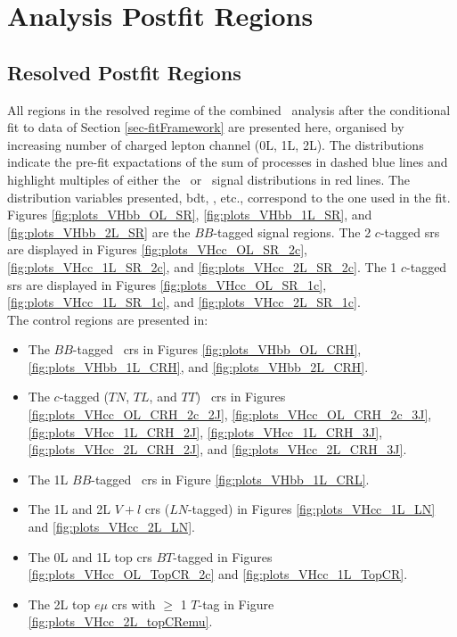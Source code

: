 \section{Analysis Postfit Regions}\label{appsec-vh-analRegPosfit}
\subsection{Resolved Postfit Regions}\label{appsec-vh-analRegResPosfit}
All regions in the resolved regime of the combined \vhbc\ analysis after the conditional fit to data of Section \ref{sec-fitFramework} are presented here, organised by increasing number of charged lepton channel (0L, 1L, 2L). The distributions indicate the pre-fit expactations of the sum of processes in dashed blue lines and highlight multiples of either the \vhb\ or \vhc\ signal distributions in red lines. The distribution variables presented, \gls{bdt}, \ptv, etc., correspond to the one used in the fit. Figures \ref{fig:plots_VHbb_OL_SR}, \ref{fig:plots_VHbb_1L_SR}, and \ref{fig:plots_VHbb_2L_SR} are the $BB$-tagged signal regions. The 2 $c$-tagged \glspl{sr} are displayed in Figures \ref{fig:plots_VHcc_OL_SR_2c}, \ref{fig:plots_VHcc_1L_SR_2c}, and \ref{fig:plots_VHcc_2L_SR_2c}. The 1 $c$-tagged \glspl{sr} are displayed in Figures \ref{fig:plots_VHcc_OL_SR_1c}, \ref{fig:plots_VHcc_1L_SR_1c}, and \ref{fig:plots_VHcc_2L_SR_1c}. \\

The control regions are presented in:
\begin{itemize}
  \item The $BB$-tagged \highdr\ \glspl{cr} in Figures \ref{fig:plots_VHbb_OL_CRH}, \ref{fig:plots_VHbb_1L_CRH}, and \ref{fig:plots_VHbb_2L_CRH}.
  \item The $c$-tagged ($TN$, $TL$, and $TT$) \highdr\ \glspl{cr} in Figures \ref{fig:plots_VHcc_OL_CRH_2c_2J}, \ref{fig:plots_VHcc_OL_CRH_2c_3J}, \ref{fig:plots_VHcc_1L_CRH_2J}, \ref{fig:plots_VHcc_1L_CRH_3J}, \ref{fig:plots_VHcc_2L_CRH_2J}, and \ref{fig:plots_VHcc_2L_CRH_3J}.
  \item The 1L $BB$-tagged \lowdr\ \glspl{cr} in Figure \ref{fig:plots_VHbb_1L_CRL}.
  \item The 1L and 2L $V+l$ \glspl{cr} ($LN$-tagged) in Figures \ref{fig:plots_VHcc_1L_LN} and \ref{fig:plots_VHcc_2L_LN}.
  \item The 0L and 1L top \glspl{cr} $BT$-tagged in Figures \ref{fig:plots_VHcc_OL_TopCR_2c} and \ref{fig:plots_VHcc_1L_TopCR}.
  \item The 2L top $e\mu$ \glspl{cr} with $\geq$ 1 $T$-tag in Figure \ref{fig:plots_VHcc_2L_topCRemu}.
\end{itemize}
  
